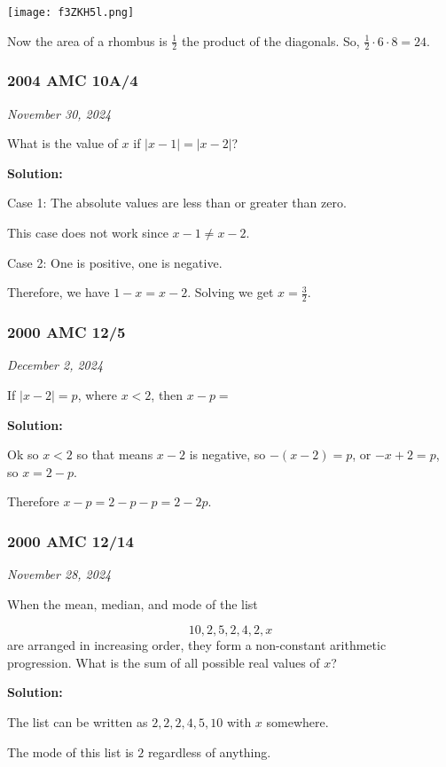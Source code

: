 \documentclass[../mathproblems.tex]{subfiles}
\begin{document}
\begin{center}
    \texttt{[image: f3ZKH5l.png]}
\end{center}

Now the area of a rhombus is $\frac{1}{2}$ the product of the diagonals. So, $\frac{1}{2}\cdot 6 \cdot 8 = \boxed{24}$.

\noindent\hrulefill
\subsubsection*{2004 AMC 10A/4} 
\textit{November 30, 2024}

What is the value of $x$ if $|x-1|=|x-2|$?

\textbf{Solution:}

Case 1: The absolute values are less than or greater than zero.

This case does not work since $x-1\neq x-2$.

Case 2: One is positive, one is negative.

Therefore, we have $1-x=x-2$. Solving we get $x=\boxed{\frac{3}{2}}$.

\noindent\hrulefill
\subsubsection*{2000 AMC 12/5} 
\textit{December 2, 2024}

If $|x - 2| = p$, where $x < 2$, then $x - p =$

\textbf{Solution:}

Ok so $x<2$ so that means $x-2$ is negative, so $-(x-2) = p$, or $-x+2 = p$, so $x=2-p$.

Therefore $x-p = 2-p-p = \boxed{2-2p}$.

\noindent\hrulefill
\subsubsection*{2000 AMC 12/14} 
\textit{November 28, 2024}

When the mean, median, and mode of the list

\[10,2,5,2,4,2,x\]
are arranged in increasing order, they form a non-constant arithmetic progression. What is the sum of all possible real values of $x$?

\textbf{Solution:}

The list can be written as $2,2,2,4,5,10$ with $x$ somewhere.

The mode of this list is $2$ regardless of anything.
\end{document}
